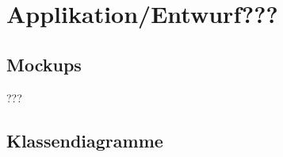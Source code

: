 
\chapter{Applikation/Entwurf???}


\section{Mockups}

???

\vspace*{2cm}



\section{Klassendiagramme}
